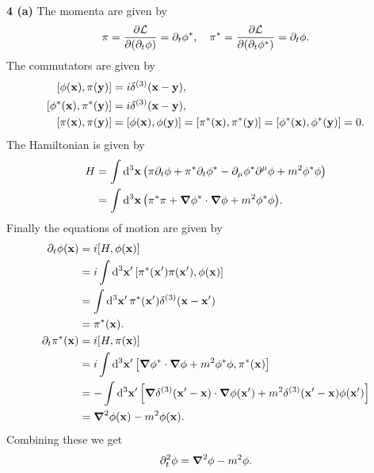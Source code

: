 \documentclass{article}
\makeatletter
\newcommand*{\shifttext}[1]{%
  \settowidth{\@tempdima}{#1}%
  \hspace{-\@tempdima}#1%
}
\newcommand{\plabel}[1]{%
\shifttext{\textbf{#1}\quad}%
}
\newcommand{\prule}{%
\begin{center}%
\hdashrule[0.5ex]{.99\linewidth}{1pt}{1pt 2.5pt}%
\end{center}%
}
\makeatother
\begin{document}
\prule

\plabel{4 (a)}%
The momenta are given by
\[ \pi = \pdv{\mathcal{L}}{(\partial_t \phi)} = \partial_t \phi^*,\quad \pi^* = \pdv{\mathcal{L}}{(\partial_t \phi^*)} = \partial_t \phi. \]
The commutators are given by
\begin{align}
    \label{eq:canon1} [\phi(\vb{x}),\pi(\vb{y})] &= i\delta^{(3)}(\vb{x} - \vb{y}), \\
    \label{eq:canon2} [\phi^*(\vb{x}),\pi^*(\vb{y})] &= i\delta^{(3)}(\vb{x} - \vb{y}), \\
    \label{eq:canon3} [\pi(\vb{x}),\pi(\vb{y})] &= [\phi(\vb{x}),\phi(\vb{y})] = [\pi^*(\vb{x}),\pi^*(\vb{y})] = [\phi^*(\vb{x}),\phi^*(\vb{y})] = 0.
\end{align}
The Hamiltonian is given by
\begin{align*}
    H &= \int\dd{^3 \vb{x}} \qty(\pi\partial_t\phi + \pi^*\partial_t\phi^* - \partial_\mu \phi^* \partial^\mu \phi + m^2 \phi^*\phi) \\
    &= \int\dd{^3 \vb{x}} \qty(\pi^* \pi + \grad\phi^* \cdot \grad\phi + m^2 \phi^*\phi).
\end{align*}
Finally the equations of motion are given by
\begin{align*}
    \partial_t \phi(\vb{x}) &= i[H,\phi(\vb{x})] \\
    &= i\int \dd{^3\vb{x}'}\qty[\pi^*(\vb{x}')\pi(\vb{x}'), \phi(\vb{x})] \\
    &= \int \dd{^3\vb{x}'} \pi^*(\vb{x}')\delta^{(3)}(\vb{x} - \vb{x}') \\
    &= \pi^*(\vb{x}). \\
    \partial_t \pi^*(\vb{x}) &= i[H,\pi(\vb{x})] \\
    &= i\int \dd{^3\vb{x}'}\qty[\grad\phi^* \cdot \grad\phi + m^2 \phi^*\phi, \pi^*(\vb{x})] \\
    &= -\int\dd{^3\vb{x}'}\qty[\grad \delta^{(3)}(\vb{x}' - \vb{x}) \cdot \grad\phi(\vb{x}') + m^2 \delta^{(3)}(\vb{x}' - \vb{x}) \phi(\vb{x}')] \\
    &= \grad^2 \phi(\vb{x}) - m^2 \phi(\vb{x}).
\end{align*}
Combining these we get
\[ \partial_t^2 \phi = \grad^2\phi - m^2\phi. \]
\end{document}
